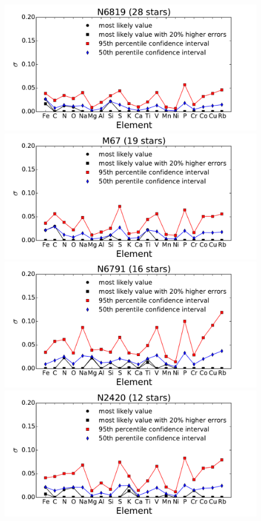 \documentclass[14pt, preprint2]{aastex6}
\begin{document}
\begin{figure}
\centering
   \includegraphics[scale=0.4]{N6819_intrinsic.pdf}
 \includegraphics[scale=0.4]{M67_intrinsic.pdf}\\
   \includegraphics[scale=0.4]{N6791_intrinsic.pdf}
     \includegraphics[scale=0.4]{N2420_intrinsic.pdf}\\

\end{figure}
\end{document}
